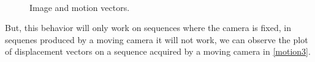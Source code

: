 \documentclass[12pt, a4paper, titlepage,twoside,openright]{article}
\begin{document}
\begin{figure}[H]
		
\centering

\\
\caption{Image and motion vectors.}
\label{motion2}
\end{figure}

But, this behavior will only work on sequences where the camera is fixed, in sequenes produced by a moving camera it will not work, we can observe the plot of displacement vectors on a sequence acquired by a moving camera in \ref{motion3}. 
\end{document}
